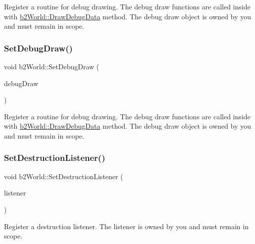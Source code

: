 Register a routine for debug drawing. The debug draw functions are called inside with \hyperlink{classb2World_a293d9865e407fd463e168b0a29856acc}{b2\+World\+::\+Draw\+Debug\+Data} method. The debug draw object is owned by you and must remain in scope. \mbox{\label{classb2World_a6976d2c67400df03c0d44174ffcfb7ee}} 
\subsubsection{\texorpdfstring{Set\+Debug\+Draw()}{SetDebugDraw()}\hspace{0.1cm}{\footnotesize\ttfamily [2/2]}}
{\footnotesize\ttfamily void b2\+World\+::\+Set\+Debug\+Draw (\begin{DoxyParamCaption}\item[{\hyperlink{classb2Draw}{b2\+Draw} $\ast$}]{debug\+Draw }\end{DoxyParamCaption})}

Register a routine for debug drawing. The debug draw functions are called inside with \hyperlink{classb2World_a293d9865e407fd463e168b0a29856acc}{b2\+World\+::\+Draw\+Debug\+Data} method. The debug draw object is owned by you and must remain in scope. \mbox{\label{classb2World_ae377f2dd5512ada7d27f4ad3541c75bf}} 
\subsubsection{\texorpdfstring{Set\+Destruction\+Listener()}{SetDestructionListener()}\hspace{0.1cm}{\footnotesize\ttfamily [1/2]}}
{\footnotesize\ttfamily void b2\+World\+::\+Set\+Destruction\+Listener (\begin{DoxyParamCaption}\item[{\hyperlink{classb2DestructionListener}{b2\+Destruction\+Listener} $\ast$}]{listener }\end{DoxyParamCaption})}

Register a destruction listener. The listener is owned by you and must remain in scope. \mbox{\label{classb2World_ae377f2dd5512ada7d27f4ad3541c75bf}} 
